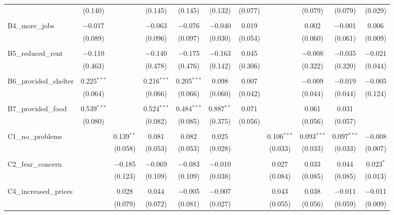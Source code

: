 \begin{table}[H]
\begin{tabular}{@{\extracolsep{4pt}}lcccccccccc}
  & (0.140) &  & (0.145) & (0.145) & (0.132) & (0.077) &  & (0.079) & (0.079) & (0.029) \\ 
  & & & & & & & & & & \\ 
 B4\_more\_jobs & $-$0.017 &  & $-$0.063 & $-$0.076 & $-$0.040 & 0.019 &  & 0.002 & $-$0.001 & 0.006 \\ 
  & (0.089) &  & (0.096) & (0.097) & (0.030) & (0.054) &  & (0.060) & (0.061) & (0.009) \\ 
  & & & & & & & & & & \\ 
 B5\_reduced\_rent & $-$0.110 &  & $-$0.140 & $-$0.175 & $-$0.163 & 0.045 &  & $-$0.008 & $-$0.035 & $-$0.021 \\ 
  & (0.463) &  & (0.478) & (0.476) & (0.142) & (0.306) &  & (0.322) & (0.320) & (0.044) \\ 
  & & & & & & & & & & \\ 
 B6\_provided\_shelter & 0.225$^{***}$ &  & 0.216$^{***}$ & 0.205$^{***}$ & 0.098 & 0.007 &  & $-$0.009 & $-$0.019 & $-$0.005 \\ 
  & (0.064) &  & (0.066) & (0.066) & (0.060) & (0.042) &  & (0.044) & (0.044) & (0.124) \\ 
  & & & & & & & & & & \\ 
 B7\_provided\_food & 0.539$^{***}$ &  & 0.524$^{***}$ & 0.484$^{***}$ & 0.887$^{**}$ & 0.071 &  & 0.061 & 0.031 &  \\ 
  & (0.080) &  & (0.082) & (0.085) & (0.375) & (0.056) &  & (0.056) & (0.057) &  \\ 
  & & & & & & & & & & \\ 
 C1\_no\_problems &  & 0.139$^{**}$ & 0.081 & 0.082 & 0.025 &  & 0.106$^{***}$ & 0.093$^{***}$ & 0.097$^{***}$ & $-$0.008 \\ 
  &  & (0.058) & (0.053) & (0.053) & (0.028) &  & (0.033) & (0.033) & (0.033) & (0.007) \\ 
  & & & & & & & & & & \\ 
 C2\_fear\_concern &  & $-$0.185 & $-$0.069 & $-$0.083 & $-$0.010 &  & 0.027 & 0.033 & 0.044 & 0.023$^{*}$ \\ 
  &  & (0.123) & (0.109) & (0.109) & (0.038) &  & (0.084) & (0.085) & (0.085) & (0.013) \\ 
  & & & & & & & & & & \\ 
 C4\_increased\_prices &  & 0.028 & 0.044 & $-$0.005 & $-$0.007 &  & 0.043 & 0.038 & $-$0.011 & $-$0.011 \\ 
  &  & (0.079) & (0.072) & (0.081) & (0.027) &  & (0.055) & (0.056) & (0.059) & (0.009) \\ 

\end{tabular}
\end{table}
